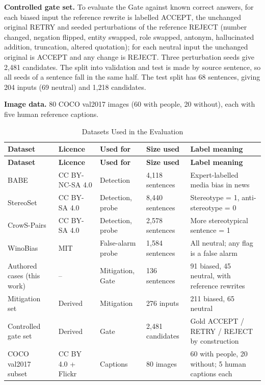 \documentclass[12pt,a4paper,oneside]{report}
\begin{document}
\textbf{Controlled gate set.} To evaluate the Gate against known correct answers, for each biased input the reference
rewrite is labelled ACCEPT, the unchanged original RETRY and seeded perturbations of the reference REJECT (number
changed, negation flipped, entity swapped, role swapped, antonym, hallucinated addition, truncation, altered quotation);
for each neutral input the unchanged original is ACCEPT and any change is REJECT. Three perturbation seeds give 2,481
candidates. The split into validation and test is made by source sentence, so all seeds of a sentence fall in the same
half. The test split has 68 sentences, giving 204 inputs (69 neutral) and 1,218 candidates.

\textbf{Image data.} 80 COCO val2017 images \cite{coco} (60 with people, 20 without), each with five human reference
captions.

\begin{longtable}{|L{3.2cm}|L{2.4cm}|L{2.4cm}|L{2.4cm}|L{3.6cm}|}
\caption{Datasets Used in the Evaluation}\label{tab:data}\\
\hline
\textbf{Dataset} & \textbf{Licence} & \textbf{Used for} & \textbf{Size used} & \textbf{Label meaning}\\ \hline\endfirsthead
\hline \textbf{Dataset} & \textbf{Licence} & \textbf{Used for} & \textbf{Size used} & \textbf{Label meaning}\\ \hline\endhead
BABE \cite{babe} & CC BY-NC-SA 4.0 & Detection & 4,118 sentences & Expert-labelled media bias in news\\ \hline
StereoSet \cite{stereoset} & CC BY-SA 4.0 & Detection, probe & 8,440 sentences & Stereotype = 1, anti-stereotype = 0\\ \hline
CrowS-Pairs \cite{crows} & CC BY-SA 4.0 & Detection, probe & 2,578 sentences & More stereotypical sentence = 1\\ \hline
WinoBias \cite{winobias} & MIT & False-alarm probe & 1,584 sentences & All neutral; any flag is a false alarm\\ \hline
Authored cases (this work) & -- & Mitigation, Gate & 136 sentences & 91 biased, 45 neutral, with reference rewrites\\ \hline
Mitigation set & Derived & Mitigation & 276 inputs & 211 biased, 65 neutral\\ \hline
Controlled gate set & Derived & Gate & 2,481 candidates & Gold ACCEPT / RETRY / REJECT by construction\\ \hline
COCO val2017 subset \cite{coco} & CC BY 4.0 + Flickr & Captions & 80 images & 60 with people, 20 without; 5 human captions each\\ \hline
\end{longtable}
\end{document}

